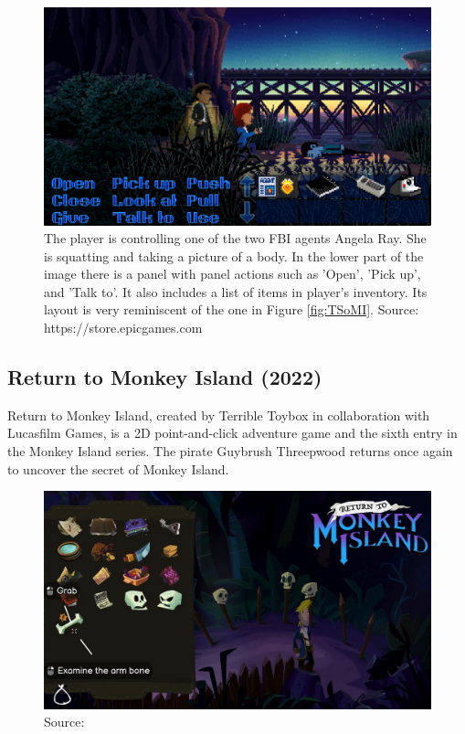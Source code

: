 \begin{figure}[H]
\centering
\includegraphics[width=1.\linewidth]{img/TWP.png}
\caption{The player is controlling one of the two FBI agents Angela Ray. She is squatting and taking a picture of a body. In the lower part of the image there is a panel with panel actions such as 'Open', 'Pick up', and 'Talk to'. It also includes a list of items in player's inventory. Its layout is very reminiscent of the one in Figure \ref{fig:TSoMI}. Source: https://store.epicgames.com \cite{epic:TWP}}
\label{fig:TWP}
\end{figure}

\subsection{Return to Monkey Island (2022)}

Return to Monkey Island, created by Terrible Toybox in collaboration with Lucasfilm Games, is a 2D point-and-click adventure game and the sixth entry in the Monkey Island series. The pirate Guybrush Threepwood returns once again to uncover the secret of Monkey Island\cite{McCaffrey2022}.


\begin{figure}[H]
\centering
\includegraphics[width=.7\linewidth]{img/RtMI1.png}
\caption{Source:  \cite{}}
\label{fig:RtMI1}
\end{figure}

